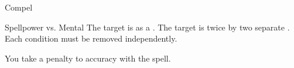 \begin{spellsection}{Compel}
\begin{spellheader}
\end{spellheader}
\begin{spellcontent}
\begin{spelltargetinginfo}
\end{spelltargetinginfo}
\begin{spelleffects}
\begin{spellattack}{Spellpower vs. Mental}
\spellsuccess The target is \immobilized as a .
\spellcritical
The target is \immobilized twice by two separate .
Each condition must be removed independently.
\end{spellattack}
\end{spelleffects}
\end{spellcontent}
\begin{spellfooter}
\end{spellfooter}
\begin{spellsubcontent}
\begin{spellcantrip}
You take a  penalty to accuracy with the spell.
\end{spellcantrip}
\end{spellsubcontent}
\end{spellsection}
